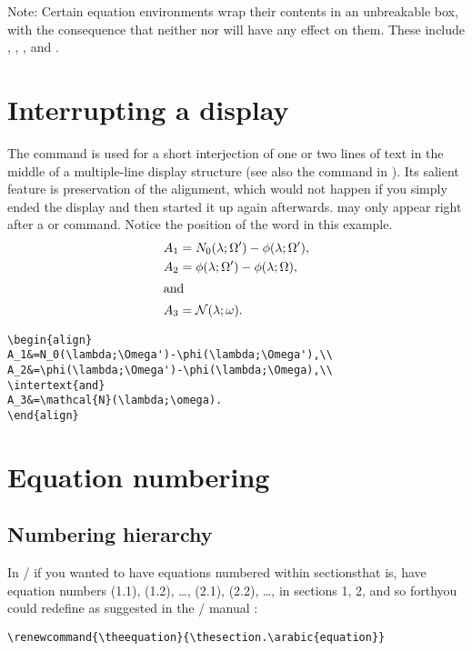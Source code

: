 \documentclass[leqno,titlepage,openany]{amsldoc}[1999/12/13]
\begin{document}
\begin{bfseries}
Note: Certain equation environments wrap their contents in an
unbreakable box, with the consequence that neither  nor
 will have any effect on them. These include
, , , and .
\end{bfseries}

\section{Interrupting a display}

The command  is used for a short interjection of one or
two lines of text in the middle of a
multiple-line display structure (see also the  command in
). Its salient feature is preservation of the alignment,
which would not happen if you simply ended the display and then started
it up again afterwards.  may only appear right after a
\cn{\\} or \cn{\\*} command. Notice the position of the word  in
this example.
\begin{align}
A_1&=N_0(\lambda;\Omega')-\phi(\lambda;\Omega'),\\
A_2&=\phi(\lambda;\Omega')-\phi(\lambda;\Omega),\\
\intertext{and}
A_3&=\mathcal{N}(\lambda;\omega).
\end{align}
\begin{verbatim}
\begin{align}
A_1&=N_0(\lambda;\Omega')-\phi(\lambda;\Omega'),\\
A_2&=\phi(\lambda;\Omega')-\phi(\lambda;\Omega),\\
\intertext{and}
A_3&=\mathcal{N}(\lambda;\omega).
\end{align}
\end{verbatim}

\section{Equation numbering}

\subsection{Numbering hierarchy}
In \latex/ if you wanted to have equations numbered within
sections\mdash that is, have
equation numbers (1.1), (1.2), \dots, (2.1), (2.2),
\dots, in sections 1, 2, and so forth\mdash you could redefine
 as suggested in the \latex/ manual \cite[\S6.3, \S
C.8.4]{lamport}:
\begin{verbatim}
\renewcommand{\theequation}{\thesection.\arabic{equation}}
\end{verbatim}
\end{document}
